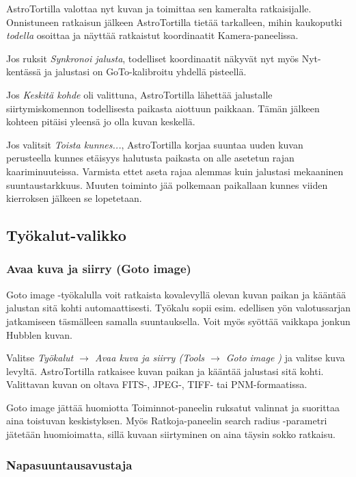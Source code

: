 \documentclass{article}
\begin{document}
AstroTortilla valottaa nyt kuvan ja toimittaa sen kameralta ratkaisijalle. Onnistuneen
ratkaisun jälkeen AstroTortilla tietää tarkalleen, mihin kaukoputki \emph{todella} osoittaa ja näyttää
ratkaistut koordinaatit Kamera-paneelissa.

Jos ruksit \emph{Synkronoi jalusta}, todelliset koordinaatit näkyvät nyt myös Nyt-kentässä ja jalustasi on GoTo-kalibroitu yhdellä pisteellä.

Jos \emph{Keskitä kohde} oli valittuna, AstroTortilla lähettää jalustalle siirtymiskomennon todellisesta paikasta aiottuun paikkaan. Tämän jälkeen kohteen pitäisi yleensä jo olla kuvan keskellä.

Jos valitsit \emph{Toista kunnes...}, AstroTortilla korjaa suuntaa uuden kuvan perusteella kunnes etäisyys halutusta paikasta on alle asetetun rajan kaariminuuteissa. Varmista ettet aseta rajaa alemmas kuin jalustasi mekaaninen suuntaustarkkuus. Muuten toiminto jää polkemaan paikallaan kunnes viiden kierroksen jälkeen se lopetetaan.

\subsection{Työkalut-valikko}

\subsubsection{Avaa kuva ja siirry (Goto image)}

Goto image -työkalulla voit ratkaista kovalevyllä olevan kuvan paikan ja kääntää jalustan sitä kohti automaattisesti.
Työkalu sopii esim. edellisen yön valotussarjan jatkamiseen täsmälleen samalla suuntauksella. Voit myös syöttää vaikkapa jonkun Hubblen kuvan.

Valitse \emph{Työkalut $\rightarrow$ Avaa kuva ja siirry (Tools $\rightarrow$ Goto image )} ja valitse kuva levyltä.
AstroTortilla ratkaisee kuvan paikan ja kääntää jalustasi sitä kohti. Valittavan kuvan on oltava FITS-, JPEG-, TIFF-
tai PNM-formaatissa.

Goto image jättää huomiotta Toiminnot-paneelin ruksatut valinnat ja suorittaa aina toistuvan keskistyksen.
Myös Ratkoja-paneelin search radius -parametri jätetään huomioimatta, sillä kuvaan siirtyminen on aina täysin sokko ratkaisu.

\subsubsection{Napasuuntausavustaja}
\end{document}
